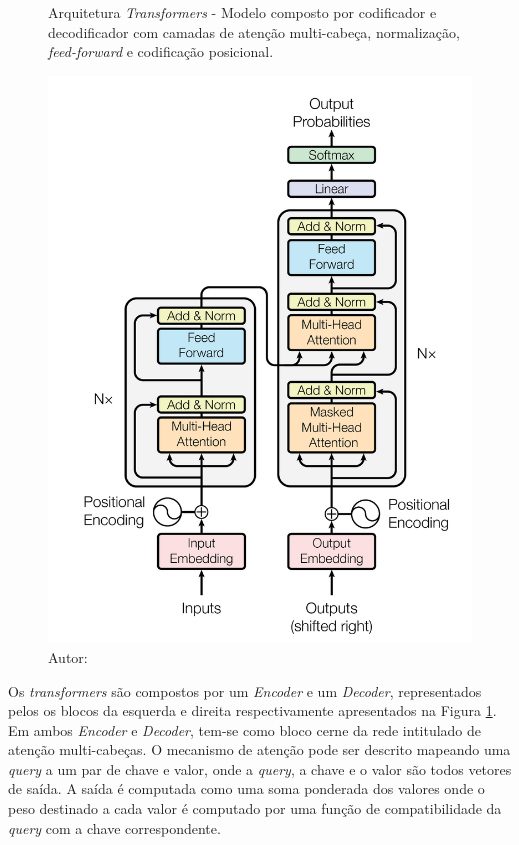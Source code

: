 \begin{figure}[htbp]
    \centering
    \captionsetup{width=0.98\textwidth, justification=justified}
    \caption{Arquitetura \textit{Transformers} - Modelo composto por codificador e decodificador com camadas de atenção multi-cabeça, normalização, \textit{feed-forward} e codificação posicional.}
    \includegraphics[scale=0.6]{figures/fig004.png}
    \caption*{Autor: }
    \label{fig:fig004}
\end{figure}

Os \textit{transformers} são compostos por um \textit{Encoder} e um \textit{Decoder}, representados pelos os blocos da esquerda e direita respectivamente apresentados na Figura \ref{fig:fig004}. Em ambos \textit{Encoder} e \textit{Decoder}, tem-se como bloco cerne da rede intitulado de atenção multi-cabeças. O mecanismo de atenção pode ser descrito mapeando uma \textit{query} a um par de chave e valor, onde a \textit{query}, a chave e o valor são todos vetores de saída. A saída é computada como uma soma ponderada dos valores onde o peso destinado a cada valor é computado por uma função de compatibilidade da \textit{query} com a chave correspondente.

